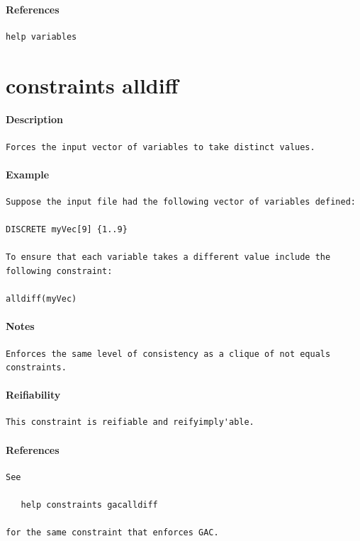 \documentclass[oneside]{book}
\begin{document}
\paragraph{References}
{\footnotesize
\begin{verbatim}
help variables
\end{verbatim}
}
\section{constraints alldiff}
\paragraph{Description}
{\footnotesize
\begin{verbatim}
Forces the input vector of variables to take distinct values.
\end{verbatim}
}
\paragraph{Example}
{\footnotesize
\begin{verbatim}
Suppose the input file had the following vector of variables defined:

DISCRETE myVec[9] {1..9}

To ensure that each variable takes a different value include the
following constraint:

alldiff(myVec)
\end{verbatim}
}
\paragraph{Notes}
{\footnotesize
\begin{verbatim}
Enforces the same level of consistency as a clique of not equals 
constraints.
\end{verbatim}
}
\paragraph{Reifiability}
{\footnotesize
\begin{verbatim}
This constraint is reifiable and reifyimply'able.
\end{verbatim}
}
\paragraph{References}
{\footnotesize
\begin{verbatim}
See

   help constraints gacalldiff

for the same constraint that enforces GAC.
\end{verbatim}
}
\end{document}
